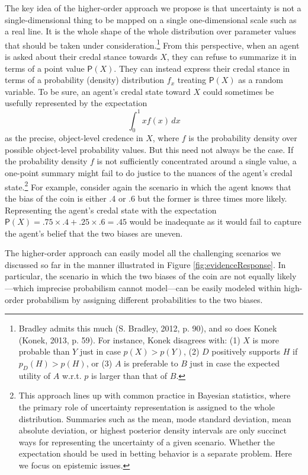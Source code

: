 \documentclass[
  10pt,
  dvipsnames,enabledeprecatedfontcommands]{scrartcl}
\begin{document}
The key idea of the higher-order approach we propose is that uncertainty
is not a single-dimensional thing to be mapped on a single
one-dimensional scale such as a real line. It is the whole shape of the
whole distribution over parameter values that should be taken under
consideration.\footnote{Bradley admits this much (S. Bradley, 2012, p.
  90), and so does Konek (Konek, 2013, p. 59). For instance, Konek
  disagrees with: (1) \(X\) is more probable than \(Y\) just in case
  \(p(X)>p(Y)\), (2) \(D\) positively supports \(H\) if
  \(p_D(H)> p(H)\), or (3) \(A\) is preferable to \(B\) just in case the
  expected utility of \(A\) w.r.t. \(p\) is larger than that of \(B\).}
From this perspective, when an agent is asked about their credal stance
towards \(X\), they can refuse to summarize it in terms of a point value
\(\mathsf{P}(X)\). They can instead express their credal stance in terms
of a probability (density) distribution \(f_x\) treating
\(\mathsf{P}(X)\) as a random variable. To be sure, an agent's credal
state toward \(X\) could sometimes be usefully represented by the
expectation\\
\[\int_{0}^{1} x f(x) \, dx\] as the precise, object-level credence in
\(X\), where \(f\) is the probability density over possible object-level
probability values. But this need not always be the case. If the
probability density \(f\) is not sufficiently concentrated around a
single value, a one-point summary might fail to do justice to the
nuances of the agent's credal state.\footnote{This approach lines up
  with common practice in Bayesian statistics, where the primary role of
  uncertainty representation is assigned to the whole distribution.
  Summaries such as the mean, mode standard deviation, mean absolute
  deviation, or highest posterior density intervals are only succinct
  ways for representing the uncertainty of a given scenario. Whether the
  expectation should be used in betting behavior is a separate problem.
  Here we focus on epistemic issues.} For example, consider again the
scenario in which the agent knows that the bias of the coin is either .4
or .6 but the former is three times more likely. Representing the
agent's credal state with the expectation
\(\mathsf{P}(X) = .75 \times .4 + .25 \times .6 = .45\) would be
inadequate as it would fail to capture the agent's belief that the two
biases are uneven.

The higher-order approach can easily model all the challenging scenarios
we discussed so far in the manner illustrated in Figure
\ref{fig:evidenceResponse}. In particular, the scenario in which the two
biases of the coin are not equally likely---which imprecise probabilism
cannot model---can be easily modeled within high-order probabilism by
assigning different probabilities to the two biases.
\end{document}
